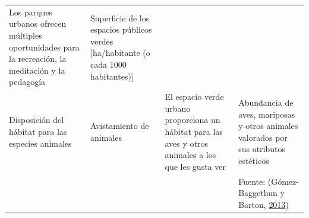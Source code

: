 \documentclass[12pt,a4paper,openany]{book}
\theoremstyle{definition}
\theoremstyle{definition}
\theoremstyle{definition}
\theoremstyle{remark}
\begin{document}
\begin{longtable}[]{@{}llll@{}}
\begin{minipage}[t]{0.19\columnwidth}
Los parques urbanos ofrecen múltiples oportunidades para la recreación,
la meditación y la pedagogía\strut
\end{minipage} & \begin{minipage}[t]{0.22\columnwidth}\raggedright\strut
Superficie de los espacios públicos verdes {[}ha/habitante (o cada 1000
habitantes){]}\strut
\end{minipage}\tabularnewline
\begin{minipage}[t]{0.26\columnwidth}\raggedright\strut
Disposición del hábitat para las especies animales\strut
\end{minipage} & \begin{minipage}[t]{0.22\columnwidth}\raggedright\strut
Avistamiento de animales\strut
\end{minipage} & \begin{minipage}[t]{0.19\columnwidth}\raggedright\strut
El espacio verde urbano proporciona un hábitat para las aves y otros
animales a los que les gusta ver\strut
\end{minipage} & \begin{minipage}[t]{0.22\columnwidth}\raggedright\strut
Abundancia de aves, mariposas y otros animales valorados por sus
atributos estéticos\strut
\end{minipage}\tabularnewline
\begin{minipage}[t]{0.26\columnwidth}\raggedright\strut
\strut
\end{minipage} & \begin{minipage}[t]{0.22\columnwidth}\raggedright\strut
\strut
\end{minipage} & \begin{minipage}[t]{0.19\columnwidth}\raggedright\strut
\strut
\end{minipage} & \begin{minipage}[t]{0.22\columnwidth}\raggedright\strut
Fuente: (Gómez-Baggethun y Barton,
\protect\hyperlink{ref-gomez-baggethun_classifying_2013}{2013})\strut
\end{minipage}\tabularnewline
\bottomrule
\end{longtable}
\end{document}
